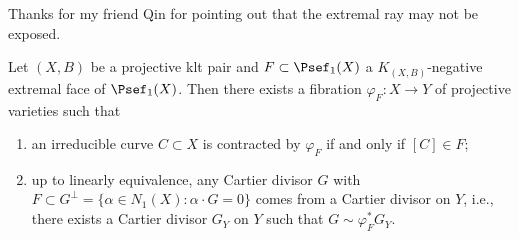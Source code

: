     \begin{remark}\label{rmk:extremal_ray_may_not_be_exposed}
        Thanks for my friend Qin for pointing out that the extremal ray may not be exposed.
    \end{remark}


    \begin{theorem}\label{thm: contraction theorem}
        Let \((X,B)\) be a projective klt pair and \(F \subset \Psef_1(X)\) a \(K_{(X,B)}\)-negative extremal face of \(\Psef_1(X)\).
        Then there exists a fibration \(\varphi_F: X \to Y\) of projective varieties such that
        \begin{enumerate}
            \item an irreducible curve \(C \subset X\) is contracted by \(\varphi_F\) if and only if \([C] \in F\);
            \item up to linearly equivalence, any Cartier divisor \(G\) with \(F \subset G^{\perp} = \{\alpha \in N_1(X) : \alpha \cdot G= 0\}\) comes from a Cartier divisor on \(Y\), 
                i.e., there exists a Cartier divisor \(G_Y\) on \(Y\) such that \(G \sim \varphi_F^* G_Y\).
        \end{enumerate}
    \end{theorem}
